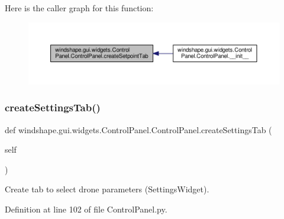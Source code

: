 Here is the caller graph for this function\+:\nopagebreak
\begin{figure}[H]
\begin{center}
\leavevmode
\includegraphics[width=350pt]{classwindshape_1_1gui_1_1widgets_1_1_control_panel_1_1_control_panel_a737c867fe353e2aa44e064cd46633d21_icgraph}
\end{center}
\end{figure}
\mbox{\label{classwindshape_1_1gui_1_1widgets_1_1_control_panel_1_1_control_panel_afac9dab02e9d0ffaa5f6e6df0c2cd9dd}} 
\subsubsection{\texorpdfstring{create\+Settings\+Tab()}{createSettingsTab()}}
{\footnotesize\ttfamily def windshape.\+gui.\+widgets.\+Control\+Panel.\+Control\+Panel.\+create\+Settings\+Tab (\begin{DoxyParamCaption}\item[{}]{self }\end{DoxyParamCaption})}

\begin{DoxyVerb}Create tab to select drone parameters (SettingsWidget).\end{DoxyVerb}
 

Definition at line 102 of file Control\+Panel.\+py.

